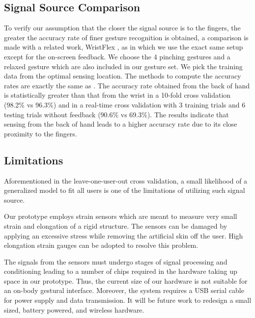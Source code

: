 \documentclass{sigchi}
\begin{document}
\subsection{Signal Source Comparison}
To verify our assumption that the closer the signal source is to the fingers, the greater the accuracy rate of finer gesture recognition is obtained, a comparison is made with a related work, WristFlex \cite{Dementyev:2014:WLG:2642918.2647396}, as in which we use the exact same setup except for the on-screen feedback.
We choose the 4 pinching gestures and a relaxed gesture \cite{Dementyev:2014:WLG:2642918.2647396} which are also included in our gesture set. We pick the training data from the optimal sensing location. The methods to compute the accuracy rates are exactly the same as \cite{Dementyev:2014:WLG:2642918.2647396}. The accuracy rate obtained from the back of hand is statistically greater than that from the wrist in a 10-fold cross validation (98.2\% vs 96.3\%) and in a real-time cross validation with 3 training trials and 6 testing trials without feedback (90.6\% vs 69.3\%). The results indicate that sensing from the back of hand leads to a higher accuracy rate due to its close proximity to the fingers.

\subsection{Limitations}
Aforementioned in the leave-one-user-out cross validation, a small likelihood of a generalized model to fit all users is one of the limitations of utilizing such signal source.

Our prototype employs strain sensors which are meant to measure very small strain and elongation of a rigid structure. The sensors can be damaged by applying an excessive stress while removing the artificial skin off the user. High elongation strain gauges can be adopted to resolve this problem.

The signals from the sensors must undergo stages of signal processing and conditioning leading to a number of chips required in the hardware taking up space in our prototype. Thus, the current size of our hardware is not suitable for an on-body gestural interface. Moreover, the system requires a USB serial cable for power supply and data transmission. It will be future work to redesign a small sized, battery powered, and wireless hardware.
\end{document}
